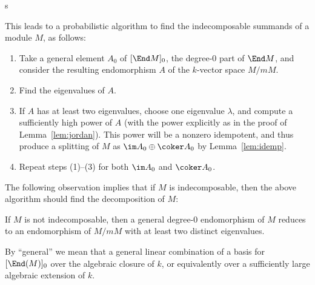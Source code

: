 s\documentclass{article}
\let\l\lambda
\numberwithin{equation}{section}
\theoremstyle{theorem}
\numberwithin{thm}{section}
\theoremstyle{definition}
\begin{document}
This leads to a probabilistic algorithm to find the indecomposable summands of a module $M$, as follows:
\begin{enumerate}
\item \label{1} Take a general element $A_0$ of $[\End M]_0$, the degree-0 part of $\End M$, and consider the resulting endomorphism $A$ of the $k$-vector space $M/mM$.
\item Find the eigenvalues of $A$.
\item If $A$ has at least two eigenvalues, choose one eigenvalue $\l$, and compute a sufficiently high power of $A$ (with the power explicitly as in the proof of Lemma~\ref{lem:jordan}). This power will be a nonzero idempotent, and thus produce a splitting of $M$ as $\im A_0 \oplus \coker A_0$ by Lemma~\ref{lem:idemp}.
\item Repeat steps (1)--(3) for both $\im A_0$ and $\coker A_0$.
\end{enumerate}

The following observation implies that if $M$ is indecomposable, then the above algorithm should find the decomposition of $M$:

\begin{lem}
  If $M$ is not indecomposable, then a general degree-0 endomorphism of $M$ reduces to an endomorphism of $M/mM$ with at least two distinct eigenvalues.
\end{lem}

\begin{rem}
  By ``general'' we mean that a general linear combination of a basis for $[\End(M)]_0$ over the algebraic closure of $k$, or equivalently over a sufficiently large algebraic extension of $k$.
\end{rem}
\end{document}
